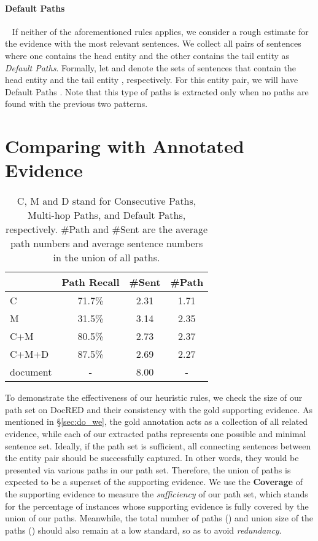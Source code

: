 \documentclass[11pt,a4paper]{article}
\begin{document}
\paragraph{Default Paths}~ If neither of the aforementioned rules applies, we consider a rough estimate for the evidence with the most relevant sentences. 
We collect all pairs of sentences where one contains the head entity and the other contains the tail entity as \textit{Default Paths}. Formally, let  and   denote the sets of sentences that contain the head entity  and the tail entity , respectively. For this entity pair, we will have  Default Paths . 
Note that this type of paths is extracted only when no paths are found with the previous two patterns. 

\section{Comparing with Annotated Evidence}

\begin{table}[]
\centering
\small
\setlength{\tabcolsep}{11pt}
\begin{tabular}{lccc}
\toprule 
      & Path Recall & \#Sent & \#Path \\ \midrule
C       & 71.7\%   & 2.31 & 1.71                \\
M       & 31.5\%    & 3.14  & 2.35                      \\
C+M     & 80.5\%    & 2.73  & 2.37                      \\
C+M+D   & 87.5\%    & 2.69 & 2.27                      \\ \midrule
document    & -    & 8.00   & -                  \\ \bottomrule
\end{tabular}
\caption{
C, M and D stand for Consecutive Paths, Multi-hop Paths, and Default Paths, respectively. \#Path and \#Sent are the average path numbers and average sentence numbers in the union of all paths.
} 
\label{tab:overlap}
\vspace{-0.25cm}
\end{table}

To demonstrate the effectiveness of our heuristic rules, we check the size of our path set on DocRED and their consistency with the gold supporting evidence. As mentioned in \S\ref{sec:do_we}, the gold annotation acts as a collection of all related evidence, while each of our extracted paths represents one possible and minimal sentence set. Ideally, if the path set is sufficient, all connecting sentences between the entity pair should be successfully captured. In other words, they would be presented via various paths in our path set. Therefore, the union of paths is expected to be a superset of the supporting evidence. We use the \textbf{Coverage} of the supporting evidence to measure the \textit{sufficiency} of our path set, which stands for the percentage of instances whose supporting evidence is fully covered by the union of our paths. Meanwhile, the total number of paths () and union size of the paths () should also remain at a low standard, so as to avoid \textit{redundancy}.
\end{document}
